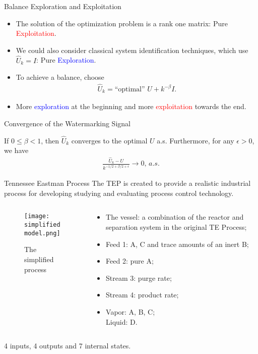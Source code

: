 \documentclass[10pt]{beamer}
\begin{document}
\begin{frame}{Balance Exploration and Exploitation}
  \begin{itemize}
    \item The solution of the optimization problem is a rank one matrix: Pure \textcolor{red}{Exploitation}.
    \item We could also consider classical system identification techniques, which use $\hat U_k=I$: Pure \textcolor{blue}{Exploration}.
    \item To achieve a balance, choose
      \begin{align*}
	\hat U_k = \text{``optimal'' } U + k^{-\beta} I.
      \end{align*}
    \item More \textcolor{blue}{exploration} at the beginning and more \textcolor{red}{exploitation} towards the end.
  \end{itemize}
\end{frame}

\begin{frame}{Convergence of the Watermarking Signal}
  \begin{theorem}
    If $0 \leq \beta < 1$, then $\hat U_k$ converges to the optimal $U$ a.s. Furthermore, for any $\epsilon > 0$, we have
    \begin{align*}
      \frac{\hat U_k - U}{k^{-1/2+\beta/2+\epsilon}} \rightarrow 0,\,a.s.
    \end{align*}
  \end{theorem}
\end{frame}

\begin{frame}{Tennessee Eastman Process}
  The TEP is created to provide a realistic industrial process for developing studying and evaluating process control technology. 
  \begin{columns}
    \begin{column}{0.45\textwidth}
      \begin{figure}
	\texttt{[image: simplifiedmodel.png]}
	\caption{The simplified process}
      \end{figure}
    \end{column}
    \begin{column}{0.55\textwidth} 		
      \begin{itemize}
	\item The vessel: a combination of the reactor and separation system in the original TE Process;
	\item Feed 1: A, C and trace amounts of an inert B;
	\item Feed 2: pure A;
	\item Stream 3: purge rate;
	\item Stream 4: product rate;
	\item Vapor: A, B, C;\\
	  Liquid: D.
      \end{itemize}
    \end{column}
  \end{columns}
  4 inputs, 4 outputs and 7 internal states.
\end{frame}
\end{document}
